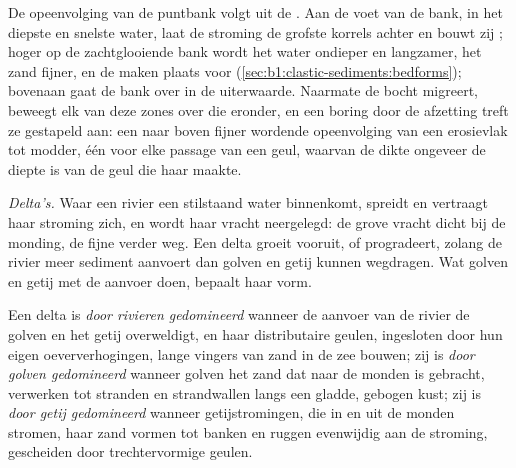 De opeenvolging van de puntbank volgt uit de . Aan de voet van de bank, in het diepste en snelste water, laat de stroming de grofste korrels achter en bouwt zij ; hoger op de zachtglooiende bank wordt het water ondieper en langzamer, het zand fijner, en de  maken plaats voor  (\cref{sec:b1:clastic-sediments:bedforms}); bovenaan gaat de bank over in de uiterwaarde. Naarmate de bocht migreert, beweegt elk van deze zones over die eronder, en een boring door de afzetting treft ze gestapeld aan: een naar boven fijner wordende opeenvolging van een erosievlak
tot modder, één voor elke passage van een geul, waarvan de dikte ongeveer de diepte is van de geul die haar maakte.

\emph{Delta's.} Waar een rivier een stilstaand water binnenkomt, spreidt en vertraagt haar stroming zich, en wordt haar vracht neergelegd: de grove vracht dicht bij de monding, de fijne verder weg. Een delta groeit vooruit, of progradeert, zolang de rivier meer sediment aanvoert dan golven en getij kunnen wegdragen. Wat golven en getij met de aanvoer doen, bepaalt haar vorm.

\begin{definition}\label{def:b1:clastic-sediments:delta}
Een delta is \emph{door rivieren gedomineerd} wanneer de aanvoer van de rivier de golven en het getij overweldigt, en haar distributaire geulen, ingesloten door hun eigen oeververhogingen, lange vingers van zand in de zee bouwen; zij is \emph{door golven gedomineerd} wanneer golven het zand dat naar de monden is gebracht, verwerken tot stranden en strandwallen langs een gladde, gebogen kust; zij is \emph{door getij gedomineerd} wanneer getijstromingen, die in en uit de monden stromen, haar zand vormen tot banken en ruggen evenwijdig aan de stroming, gescheiden door trechtervormige geulen.
\end{definition}

